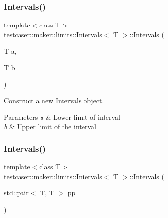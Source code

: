 \subsubsection{\texorpdfstring{Intervals()}{Intervals()}\hspace{0.1cm}{\footnotesize\ttfamily [1/2]}}
{\footnotesize\ttfamily template$<$class T$>$ \\
\mbox{\hyperlink{structtestcaser_1_1maker_1_1limits_1_1Intervals}{testcaser\+::maker\+::limits\+::\+Intervals}}$<$ T $>$\+::\mbox{\hyperlink{structtestcaser_1_1maker_1_1limits_1_1Intervals}{Intervals}} (\begin{DoxyParamCaption}\item[{T}]{a,  }\item[{T}]{b }\end{DoxyParamCaption})\hspace{0.3cm}{\ttfamily [inline]}}



Construct a new \mbox{\hyperlink{structtestcaser_1_1maker_1_1limits_1_1Intervals}{Intervals}} object. 


\begin{DoxyParams}{Parameters}
{\em a} & Lower limit of interval \\
\hline
{\em b} & Upper limit of the interval \\
\hline
\end{DoxyParams}
\mbox{\label{structtestcaser_1_1maker_1_1limits_1_1Intervals_ad899dc031cbffd5247b9b39e23577a52}} 
\subsubsection{\texorpdfstring{Intervals()}{Intervals()}\hspace{0.1cm}{\footnotesize\ttfamily [2/2]}}
{\footnotesize\ttfamily template$<$class T$>$ \\
\mbox{\hyperlink{structtestcaser_1_1maker_1_1limits_1_1Intervals}{testcaser\+::maker\+::limits\+::\+Intervals}}$<$ T $>$\+::\mbox{\hyperlink{structtestcaser_1_1maker_1_1limits_1_1Intervals}{Intervals}} (\begin{DoxyParamCaption}\item[{std\+::pair$<$ T, T $>$}]{pp }\end{DoxyParamCaption})\hspace{0.3cm}{\ttfamily [inline]}}



